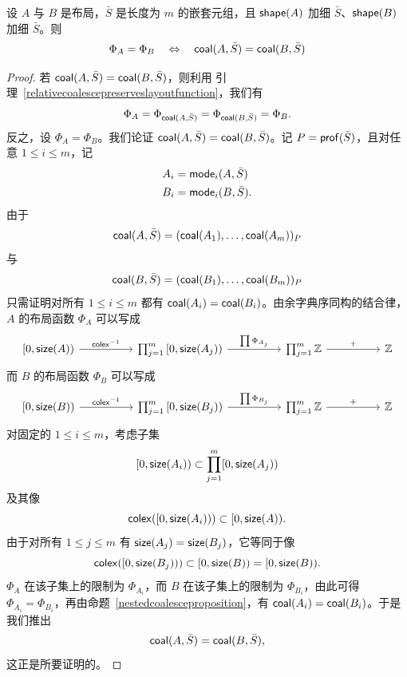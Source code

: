 \begin{proposition}\label{relativecoalescedlayoutscharacterizedbylayoutfunction}
    设 $A$ 与 $B$ 是布局，$\bar{S}$ 是长度为 $m$ 的嵌套元组，且 $\mathsf{shape}(A)$ 加细 $\bar{S}$、$\mathsf{shape}(B)$ 加细 $\bar{S}$。则
    \[\Phi_A = \Phi_B \quad \Leftrightarrow \quad
    \mathsf{coal}(A,\bar{S}) = \mathsf{coal}(B,\bar{S})
    \]
\end{proposition}

\begin{proof}
    若 $\mathsf{coal}(A,\bar{S}) = \mathsf{coal}(B,\bar{S})$，则利用
    引理~\ref{relativecoalescepreserveslayoutfunction}，我们有
    \[
    \Phi_A = \Phi_{\mathsf{coal}(A,\bar{S})} = \Phi_{\mathsf{coal}(B,\bar{S})} = \Phi_B.
    \]
    反之，设 $\Phi_A = \Phi_B$。我们论证 $\mathsf{coal}(A,\bar{S}) = \mathsf{coal}(B,\bar{S})$。记 $P = \mathsf{prof}(\bar{S})$，且对任意 $1 \leq i \leq m$，记
    \begin{align*}
    A_i & = \mathsf{mode}_i(A,\bar{S})\\
    B_i & = \mathsf{mode}_i(B,\bar{S}).
    \end{align*}
    由于
    \[
    \mathsf{coal}(A,\bar{S}) =(\mathsf{coal}(A_1),\dots,\mathsf{coal}(A_m))_P
    \]
    与
    \[
    \mathsf{coal}(B,\bar{S}) = (\mathsf{coal}(B_1),\dots,\mathsf{coal}(B_m))_P
    \]
    只需证明对所有 $1 \leq i \leq m$ 都有 $\mathsf{coal}(A_i) = \mathsf{coal}(B_i)$。由余字典序同构的结合律，$A$ 的布局函数 $\Phi_A$ 可以写成
    \[
    \begin{tikzcd} 
    {[}0,\size(A){)} \ar[rr,"\colex^{-1}"] & & \prod_{j=1}^m {[}0,\size(A_j) {)} \ar[rr,"\prod \Phi_{A_j}"] & & \prod_{j=1}^m \mathbb{Z} \ar[rr,"+"] & & \mathbb{Z} 
    \end{tikzcd} 
    \]
    而 $B$ 的布局函数 $\Phi_B$ 可以写成
    \[
    \begin{tikzcd} 
    {[}0,\size(B){)} \ar[rr,"\colex^{-1}"] & & \prod_{j=1}^m {[}0,\size(B_j) {)} \ar[rr,"\prod \Phi_{B_j}"] & & \prod_{j=1}^m \mathbb{Z} \ar[rr,"+"] & & \mathbb{Z} 
    \end{tikzcd} 
    \]
    对固定的 $1 \leq i \leq m$，考虑子集
    \[
    [0,\mathsf{size}(A_i)) \subset \prod_{j=1}^m [0,\mathsf{size}(A_j))
    \]
    及其像
    \[
    \mathsf{colex}([0,\mathsf{size}(A_i))) \subset [0,\mathsf{size}(A)).
    \]
    由于对所有 $1 \leq j \leq m$ 有 $\mathsf{size}(A_j) = \mathsf{size}(B_j)$，它等同于像
    \[
    \mathsf{colex}([0,\mathsf{size}(B_j))) \subset [0,\mathsf{size}(B)) = [0,\mathsf{size}(B)).
    \]
    $\Phi_A$ 在该子集上的限制为 $\Phi_{A_i}$，而 $B$ 在该子集上的限制为 $\Phi_{B_i}$，由此可得 $\Phi_{A_i} = \Phi_{B_i}$，再由命题~\ref{nestedcoalesceproposition}，有 $\mathsf{coal}(A_i) = \mathsf{coal}(B_i)$。于是我们推出
    \[
    \mathsf{coal}(A,\bar{S}) = \mathsf{coal}(B,\bar{S}),
    \]
    这正是所要证明的。
\end{proof}

